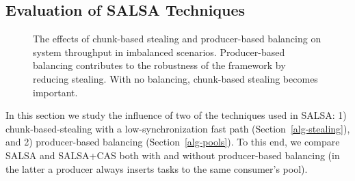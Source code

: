 \subsection{Evaluation of SALSA Techniques}
\label{sec:eval-techniques}
\begin{figure}[htb]
	\centering
  \vspace{-10pt}
	\caption{\footnotesize{The effects of chunk-based stealing and producer-based balancing on system throughput in imbalanced scenarios. Producer-based balancing contributes to the robustness of the framework by reducing stealing. With no balancing, chunk-based stealing becomes important. }}
	\vspace{-10pt}
	\label{fig:1-n-salsa}
\end{figure}
In this section we study the influence of two of the techniques used in SALSA: 1) chunk-based-stealing with a low-synchronization fast path (Section~\ref{alg-stealing}), and 2) producer-based balancing (Section~\ref{alg-pools}). 
To this end, we compare SALSA and SALSA+CAS both with and without producer-based balancing (in the latter a producer always inserts tasks to the same consumer's pool).

